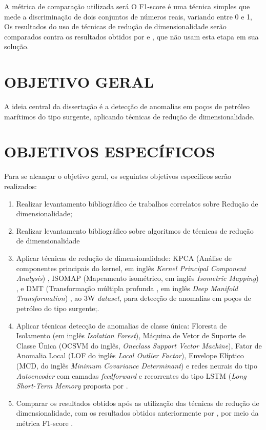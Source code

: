 A métrica de comparação utilizada será  O F1-score é uma técnica simples que mede a discriminação de dois conjuntos de números reais\cite{F1akay2009support}, variando entre 0 e 1, Os resultados do uso de técnicas de redução de dimensionalidade serão comparados contra os resultados obtidos por   e , que não usam esta etapa em sua solução.


\section{OBJETIVO GERAL}
A ideia central da dissertação é a detecção de anomalias em poços de petróleo marítimos do tipo surgente, aplicando técnicas de redução de dimensionalidade.

\section{OBJETIVOS ESPECÍFICOS}
Para se alcançar o objetivo geral, os seguintes objetivos específicos serão realizados:
\begin{enumerate}

	\item {Realizar levantamento bibliográfico de trabalhos correlatos sobre Redução de dimensionalidade;}

	\item {Realizar levantamento bibliográfico sobre algoritmos de técnicas de redução de dimensionalidade }

	\item {Aplicar técnicas de redução de dimensionalidade:  KPCA (Análise de componentes principais do kernel, em inglês \textit {Kernel Principal Component Analysis}) \cite{nanga2021review}, ISOMAP (Mapeamento isométrico, em inglês \textit{Isometric Mapping}) \cite{jia2022iso}, e DMT (Transformação múltipla profunda , em inglês \textit{Deep Manifold Transformation}) \cite{li2020DTM}, ao 3W \textit{dataset}, para detecção de anomalias em poços de petróleo do tipo surgente;\cite{vargas2019base}}.
	
	\item {Aplicar técnicas detecção de anomalias de classe única:  Floresta de Isolamento (em inglês \textit{Isolation Forest}), Máquina de Vetor de Suporte de Classe Única (OCSVM do inglês, \textit{Oneclass Support Vector Machine}), Fator de Anomalia Local (LOF do inglês \textit{Local Outlier Factor}), Envelope Elíptico (MCD, do inglês \textit{Minimum Covariance Determinant}) e redes neurais do tipo \textit{Autoencoder} com camadas \textit{feedforward} e recorrentes do tipo LSTM (\textit{Long Short-Term Memory}} proposta por \cite{fernandes2022comparaccao}. 

    
    \item {Comparar os resultados obtidos após as utilização das técnicas de redução de dimensionalidade, com os resultados obtidos anteriormente por \cite{fernandes2022comparaccao}}, por meio da métrica F1-score .
    

\end{enumerate}


